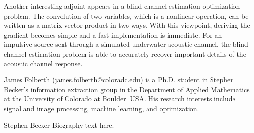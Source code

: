 \documentclass[journal]{IEEEtran}
\begin{document}
Another interesting adjoint appears in a blind channel estimation optimization problem.  The convolution of two variables, which is a nonlinear operation, can be written as a matrix-vector product in two ways.  With this viewpoint, deriving the gradient becomes simple and a fast implementation is immediate.  For an impulsive source sent through a simulated underwater acoustic channel, the blind channel estimation problem is able to accurately recover important details of the acoustic channel response.





\begin{IEEEbiographynophoto}{James Folberth}
(james.folberth@colorado.edu) is a Ph.D. student in Stephen Becker's information extraction group in the Department of Applied Mathematics at the University of Colorado at Boulder, USA.  His research interests include signal and image processing, machine learning, and optimization.
\end{IEEEbiographynophoto}

\begin{IEEEbiographynophoto}{Stephen Becker}
Biography text here.
\end{IEEEbiographynophoto}
\end{document}
